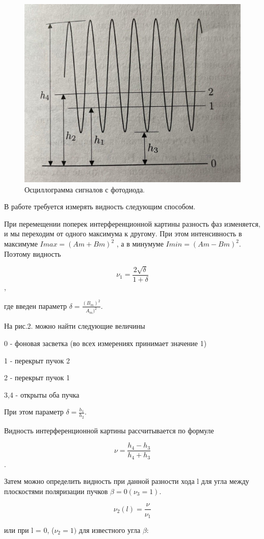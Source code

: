 \documentclass[a4paper,12pt]{article}
\begin{document}
  \begin{figure}[H]
  \begin{center}
    \includegraphics[width=9 cm]{ex2.jpg}
    \caption{Осциллограмма сигналов с фотодиода.}
    \label{fig:}
  \end{center}
\end{figure}

 В работе требуется измерять видность следующим способом.
 
 При перемещении поперек интерференционной картины разность фаз изменяется, и мы переходим от одного максимума к другому. При этом интенсивность в максимуме $Imax = (Am + Bm)^2$ , а в минумуме $Imin = (Am - Bm)^2$. Поэтому видность 
 
\[ \nu_1 = \frac{2\sqrt{\delta }}{1 + \delta} \],

где введен параметр $\delta  = \frac{(B_m)^2 }{A_m)^2}$. 

На рис.2. можно найти следующие величины 


0 - фоновая засветка (во всех измерениях принимает значение 1)


1 - перекрыт пучок 2


2 - перекрыт пучок 1


3,4 - открыты оба пучка


При этом параметр  $\delta =\frac{h_1}{h_2}$.


Видность интерференционной картины рассчитывается по формуле


\[\nu = \frac{h_4 - h_3}{h_4 + h_3} \].


Затем можно определить видность при данной разности хода l для угла между плоскостями поляризации пучков $\beta = 0 (\nu_3 = 1)$.

\[ \nu_2(l) = \frac{\nu }{\nu_1} \]


или при l = 0, ($\nu_2 = 1)$ для известного угла $\beta$:
\end{document}
